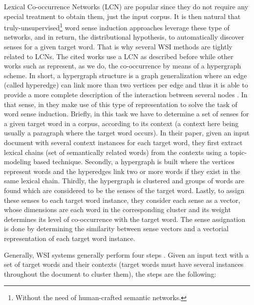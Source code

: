 Lexical Co-occurrence Networks (LCN) are  popular  since they do not require any special treatment to obtain them, just the input corpus. It is then natural that truly-unsupervised\footnote{Without the need of human-crafted semantic networks.} word sense induction approaches leverage these type of networks, and in return, the distributional hypothesis, to automatically discover senses for a given target word. That is why several WSI methods \cite{2004.Veronis,2007.Klapaftis.UoY,2010.Navigli.InducingWordSenses.Triangles,2008.Klapaftis.WSIUsingCollocations,2011.DiMarco.Navigli.ClusteringWebSearch,2011.Jurgens.WSICommunityDetection} are tightly related to LCNs. 
The cited works use a LCN as described before while other works such as \cite{2007.Navigli.GraphConnectivity,2014.Tao.Qian.LexicalChainHypergraphWSI} represent, as we do, the co-occurrence by means of a hypergraph scheme. In short, a hypergraph structure is a graph generalization where an edge (called hyperedge) can link more than two vertices per edge and thus it is able to provide a more complete description of the interaction between several nodes \cite{estrada2005}. In that sense, in  \cite{2014.Tao.Qian.LexicalChainHypergraphWSI} they make use of this type of representation to solve the task of word sense induction. Briefly, in this task we have to determine a set of senses for a given target word in a corpus, according to its context (a context here being usually a paragraph where the target word occurs). In their paper, given an input document with several context instances for each target word, they first extract lexical chains (set of semantically related words) from the contexts using a topic-modeling based technique. Secondly, a hypergraph is built where the vertices represent words and the hyperedges link two or more words if they exist in the same lexical chain. Thirdly, the hypergraph is clustered and groups of words are found which are considered to be the senses of the target word. Lastly, to assign these senses to each target word instance, they consider each sense as a vector, whose dimensions are each word in the corresponding cluster and its weight determines its level of co-occurrence  with the target word. The sense assignation is done by determining the similarity between sense vectors and a vectorial representation of each target word instance.

Generally, WSI systems generally perform four steps . Given an input text with a set of target words and their contexts (target words must have several instances throughout the document to cluster them), the steps are the following:

